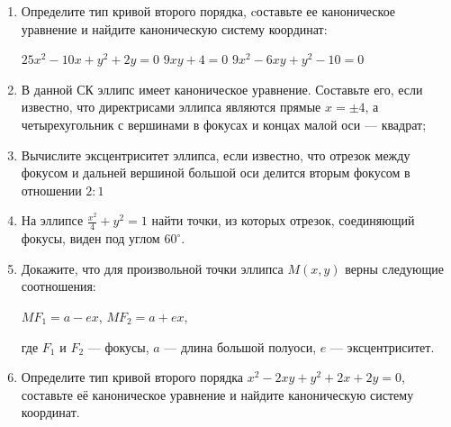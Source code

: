 \begin{enumerate}
    \item Определите тип кривой второго порядка, cоставьте ее каноническое уравнение и найдите каноническую систему координат:
   		\begin{tasks}
   			\task $25x^2 - 10x +y^2 +2y=0$
   				\task $9xy + 4 = 0$
   			\task $9x^2 - 6xy +y^2 -10 = 0$
   	
   		
   		\end{tasks}
   	\item В данной СК эллипс имеет каноническое уравнение. Составьте его, если известно, что директрисами эллипса являются прямые $x=\pm4$, а четырехугольник с вершинами в фокусах и концах малой оси --- квадрат;

	\item Вычислите эксцентриситет эллипса, если известно, что отрезок между фокусом и дальней вершиной большой оси делится вторым фокусом в отношении $2:1$


    \item На эллипсе $\frac{x^2}{4} + y^2 = 1$ найти точки, из которых отрезок, соединяющий фокусы, виден под углом $60^{\circ}$. 
    
    \item Докажите, что для произвольной точки эллипса $M(x,y)$ верны следующие соотношения:
        \begin{tasks}
   			\task $MF_1 = a - ex$,
   			\task $MF_2 = a + ex$,
   		\end{tasks}
   		где $F_1$ и $F_2$ --- фокусы, $a$ --- длина большой полуоси, $e$ ---  эксцентриситет.
    
    \item Определите тип кривой второго порядка $x^2 - 2xy + y^2 + 2x + 2y = 0$, составьте её каноническое уравнение и найдите каноническую систему координат.
    
\end{enumerate}